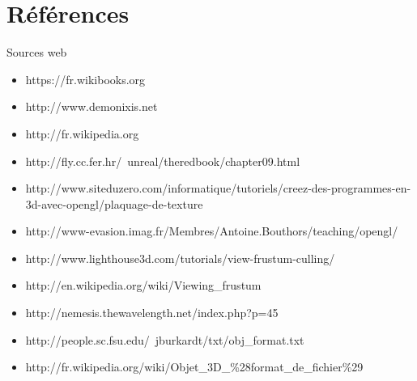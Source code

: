 \documentclass{report}
\begin{document}
	\chapter{Références}
	Sources web
	\begin{itemize}
		\item https://fr.wikibooks.org
		\item http://www.demonixis.net
		\item http://fr.wikipedia.org
		\item http://fly.cc.fer.hr/~unreal/theredbook/chapter09.html
		\item http://www.siteduzero.com/informatique/tutoriels/creez-des-programmes-en-3d-avec-opengl/plaquage-de-texture
		\item http://www-evasion.imag.fr/Membres/Antoine.Bouthors/teaching/opengl/
		\item http://www.lighthouse3d.com/tutorials/view-frustum-culling/
		\item http://en.wikipedia.org/wiki/Viewing\_frustum
		\item http://nemesis.thewavelength.net/index.php?p=45
		\item http://people.sc.fsu.edu/~jburkardt/txt/obj\_format.txt
		\item http://fr.wikipedia.org/wiki/Objet\_3D\_\%28format\_de\_fichier\%29

	\end{itemize}

	
\end{document}
